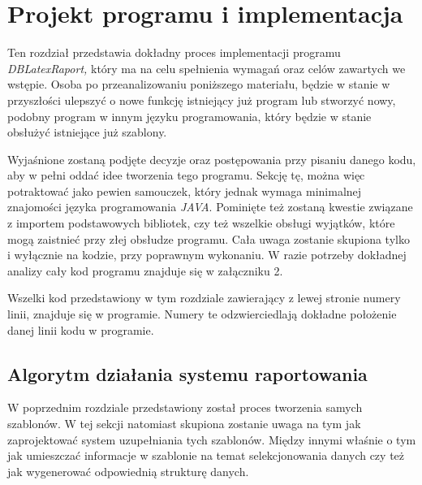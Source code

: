 \chapter{Projekt programu i implementacja}

Ten rozdział przedstawia dokładny proces implementacji programu \emph{DBLatexRaport,}  który ma na celu spełnienia wymagań oraz celów zawartych we wstępie.  Osoba po przeanalizowaniu poniższego materiału, będzie w stanie w przyszłości ulepszyć o nowe funkcję istniejący już program lub stworzyć nowy, podobny program w innym języku programowania, który będzie w stanie obsłużyć istniejące już szablony. 
\par
 Wyjaśnione zostaną podjęte decyzje oraz postępowania przy pisaniu danego kodu, aby w pełni oddać idee tworzenia tego programu. Sekcję tę, można więc potraktować jako pewien samouczek, który jednak wymaga minimalnej znajomości języka programowania \emph{JAVA}. Pominięte też zostaną kwestie związane z importem podstawowych bibliotek, czy też wszelkie obsługi wyjątków, które mogą zaistnieć przy złej obsłudze programu. Cała uwaga zostanie skupiona tylko i wyłącznie na kodzie, przy poprawnym wykonaniu. W razie potrzeby dokładnej analizy cały kod programu znajduje się w załączniku 2.
 \par
 Wszelki kod przedstawiony w tym rozdziale zawierający z lewej stronie numery linii, znajduje się w programie. Numery te  odzwierciedlają dokładne położenie danej linii kodu w programie.

\section{Algorytm działania systemu raportowania}

W poprzednim rozdziale przedstawiony został proces tworzenia samych szablonów. W tej sekcji natomiast skupiona zostanie uwaga na tym jak zaprojektować system uzupełniania tych szablonów. Między innymi właśnie o tym jak umieszczać informacje w szablonie na temat selekcjonowania danych czy też jak wygenerować odpowiednią strukturę danych.

